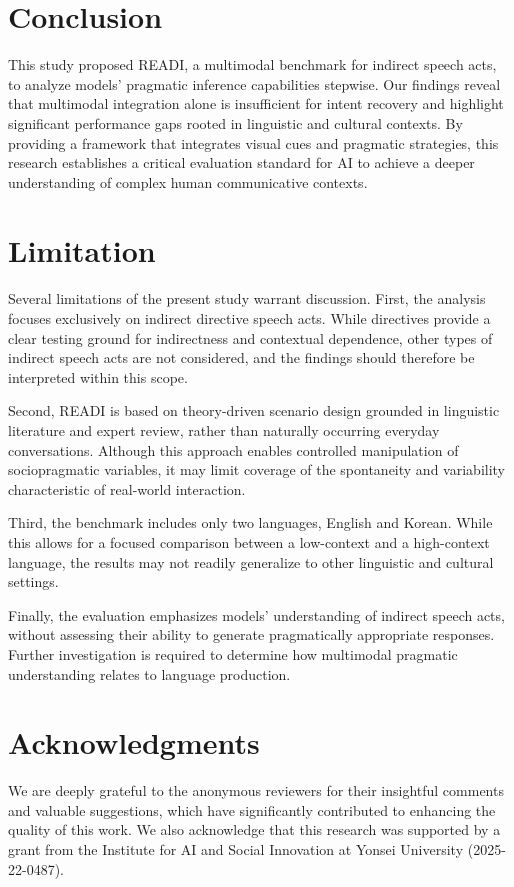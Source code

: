 \documentclass[11pt]{article}
\begin{document}
\section{Conclusion}
This study proposed READI, a multimodal benchmark for indirect speech acts, to analyze models' pragmatic inference capabilities stepwise. Our findings reveal that multimodal integration alone is insufficient for intent recovery and highlight significant performance gaps rooted in linguistic and cultural contexts. By providing a framework that integrates visual cues and pragmatic strategies, this research establishes a critical evaluation standard for AI to achieve a deeper understanding of complex human communicative contexts.

\section{Limitation}
Several limitations of the present study warrant discussion.
First, the analysis focuses exclusively on indirect directive speech acts. While directives provide a clear testing ground for indirectness and contextual dependence, other types of indirect speech acts are not considered, and the findings should therefore be interpreted within this scope.

Second, READI is based on theory-driven scenario design grounded in linguistic literature and expert review, rather than naturally occurring everyday conversations. Although this approach enables controlled manipulation of sociopragmatic variables, it may limit coverage of the spontaneity and variability characteristic of real-world interaction.

Third, the benchmark includes only two languages, English and Korean. While this allows for a focused comparison between a low-context and a high-context language, the results may not readily generalize to other linguistic and cultural settings.

Finally, the evaluation emphasizes models’ understanding of indirect speech acts, without assessing their ability to generate pragmatically appropriate responses. Further investigation is required to determine how multimodal pragmatic understanding relates to language production.


\section*{Acknowledgments}
 We are deeply grateful to the anonymous reviewers for their insightful comments and valuable suggestions, which have significantly contributed to enhancing the quality of this work. We also acknowledge that this research was supported by a grant from the Institute for AI and Social Innovation at Yonsei University (2025-22-0487).
\end{document}
